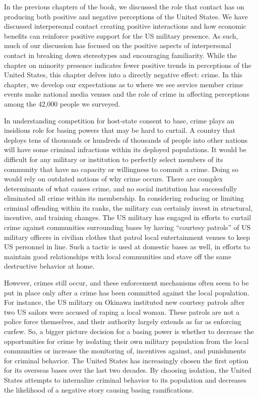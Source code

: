 In the previous chapters of the book, we discussed the role that contact has on producing both positive and negative perceptions of the United States. We have discussed interpersonal contact creating positive interactions and how economic benefits can reinforce positive support for the US military presence. As such, much of our discussion has focused on the positive aspects of interpersonal contact in breaking down stereotypes and encouraging familiarity. While the chapter on minority presence indicates fewer positive trends in perceptions of the United States, this chapter delves into a directly negative effect: crime. In this chapter, we develop our expectations as to where we see service member crime events make national media venues and the role of crime in affecting perceptions among the 42,000 people we surveyed. 

In understanding competition for host-state consent to base, crime plays an insidious role for basing powers that may be hard to curtail. A country that deploys tens of thousands or hundreds of thousands of people into other nations will have some criminal infractions within its deployed populations. It would be difficult for any military or institution to perfectly select members of its community that have no capacity or willingness to commit a crime. Doing so would rely on outdated notions of why crime occurs. There are complex determinants of what causes crime, and no social institution has successfully eliminated all crime within its membership. In considering reducing or limiting criminal offending within its ranks, the military can certainly invest in structural, incentive, and training changes. The US military has engaged in efforts to curtail crime against communities surrounding bases by having ``courtesy patrols'' of US military officers in civilian clothes that patrol local entertainment venues to keep US personnel in line\cite{koreaone20210926}. Such a tactic is used at domestic bases as well, in efforts to maintain good relationships with local communities and stave off the same destructive behavior at home\cite{Wood8272010}. 

However, crimes still occur, and these enforcement mechanisms often seem to be put in place only after a crime has been committed against the local population. For instance, the US military on Okinawa instituted new courtesy patrols after two US sailors were accused of raping a local woman\cite{McCurry10172012}. These patrols are not a police force themselves, and their authority largely extends as far as enforcing curfew\cite{DVIDS11212012}. So, a bigger picture decision for a basing power is whether to decrease the opportunities for crime by isolating their own military population from the local communities or increase the monitoring of, incentives against, and punishments for criminal behavior. The United States has increasingly chosen the first option for its overseas bases over the last two decades. By choosing isolation, the United States attempts to internalize criminal behavior to its population and decreases the likelihood of a negative story causing basing ramifications. 

